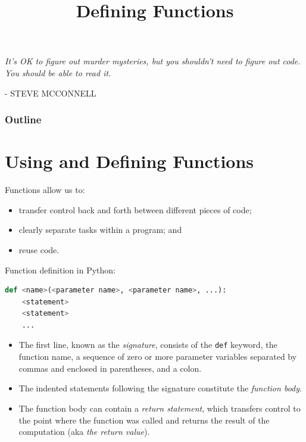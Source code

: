 \documentclass[8pt,a4paper,compress,handout]{beamer}
\title{Defining Functions}
\date{}
\begin{document}
\begin{frame}
\hfill
\begin{minipage}{150pt}
\begin{flushright}
\tiny \emph{It's OK to figure out murder mysteries, but you shouldn't need to figure out code. You should be able to read it.} 

\smallskip

- STEVE MCCONNELL
\end{flushright}
\end{minipage}
\vfill
\titlepage
\end{frame}

\begin{frame}
\frametitle{Outline}
\tableofcontents
\end{frame}

\section{Using and Defining Functions}
\begin{frame}[fragile]
Functions allow us to:
\begin{itemize}
\item transfer control back and forth between different pieces of code; 
\item clearly separate tasks within a program; and
\item reuse code.
\end{itemize}

\bigskip

Function definition in Python:
\begin{lstlisting}[language=Python]
def <name>(<parameter name>, <parameter name>, ...):
    <statement>
    <statement>
    ...
\end{lstlisting}

\begin{itemize}
\item The first line, known as the \emph{signature}, consists of the \lstinline{def} keyword, the function name, a sequence of zero or more parameter variables separated by commas and enclosed in parentheses, and a colon.

\item The indented statements following the signature constitute the \emph{function body}.

\item The function body can contain a \emph{return statement}, which transfers control to the point where the function was called and returns the result of the computation (aka \emph{the return value}).
\end{itemize}
\end{frame}
\end{document}
